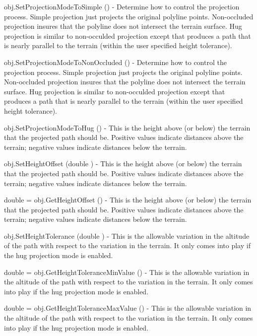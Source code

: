 \begin{DoxyItemize}
\item {\ttfamily obj.\-Set\-Projection\-Mode\-To\-Simple ()} -\/ Determine how to control the projection process. Simple projection just projects the original polyline points. Non-\/occluded projection insures that the polyline does not intersect the terrain surface. Hug projection is similar to non-\/occulded projection except that produces a path that is nearly parallel to the terrain (within the user specified height tolerance).  
\item {\ttfamily obj.\-Set\-Projection\-Mode\-To\-Non\-Occluded ()} -\/ Determine how to control the projection process. Simple projection just projects the original polyline points. Non-\/occluded projection insures that the polyline does not intersect the terrain surface. Hug projection is similar to non-\/occulded projection except that produces a path that is nearly parallel to the terrain (within the user specified height tolerance).  
\item {\ttfamily obj.\-Set\-Projection\-Mode\-To\-Hug ()} -\/ This is the height above (or below) the terrain that the projected path should be. Positive values indicate distances above the terrain; negative values indicate distances below the terrain.  
\item {\ttfamily obj.\-Set\-Height\-Offset (double )} -\/ This is the height above (or below) the terrain that the projected path should be. Positive values indicate distances above the terrain; negative values indicate distances below the terrain.  
\item {\ttfamily double = obj.\-Get\-Height\-Offset ()} -\/ This is the height above (or below) the terrain that the projected path should be. Positive values indicate distances above the terrain; negative values indicate distances below the terrain.  
\item {\ttfamily obj.\-Set\-Height\-Tolerance (double )} -\/ This is the allowable variation in the altitude of the path with respect to the variation in the terrain. It only comes into play if the hug projection mode is enabled.  
\item {\ttfamily double = obj.\-Get\-Height\-Tolerance\-Min\-Value ()} -\/ This is the allowable variation in the altitude of the path with respect to the variation in the terrain. It only comes into play if the hug projection mode is enabled.  
\item {\ttfamily double = obj.\-Get\-Height\-Tolerance\-Max\-Value ()} -\/ This is the allowable variation in the altitude of the path with respect to the variation in the terrain. It only comes into play if the hug projection mode is enabled.  

\end{DoxyItemize}
